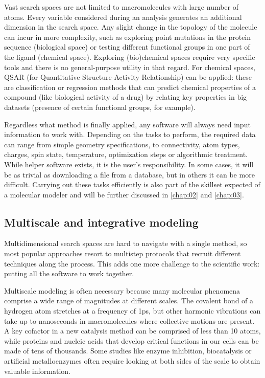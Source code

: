 Vast search spaces are not limited to macromolecules with large number of atoms. Every variable considered during an analysis generates an additional dimension in the search space. Any slight change in the topology of the molecule can incur in more complexity, such as exploring point mutations in the protein sequence (biological space) or testing different functional groups in one part of the ligand (chemical space). Exploring (bio)chemical spaces require very specific tools and there is no general-purpose utility in that regard. For chemical spaces, QSAR (for Quantitative Structure-Activity Relationship) can be applied: these are classification or regression methods that can predict chemical properties of a compound (like biological activity of a drug) by relating key properties in big datasets (presence of certain functional groups, for example).

Regardless what method is finally applied, any software will always need input information to work with. Depending on the tasks to perform, the required data can range from simple geometry specifications, to connectivity, atom types, charges, spin state, temperature, optimization steps or algorithmic treatment. While helper software exists, it is the user’s responsibility. In some cases, it will be as trivial as downloading a file from a database, but in others it can be more difficult. Carrying out these tasks efficiently is also part of the skillset expected of a molecular modeler and will be further discussed in \autoref{chap:02} and \autoref{chap:03}.

\subsection{Multiscale and integrative modeling}
Multidimensional search spaces are hard to navigate with a single method, so most popular approaches resort to multistep protocols that recruit different techniques along the process. This adds one more challenge to the scientific work: putting all the software to work together.

Multiscale modeling is often necessary because many molecular phenomena comprise a wide range of magnitudes at different scales. The covalent bond of a hydrogen atom stretches at a frequency of 1ps, but other harmonic vibrations can take up to nanoseconds in macromolecules where collective motions are present. A key cofactor in a new catalysis method can be comprised of less than 10 atoms, while proteins and nucleic acids that develop critical functions in our cells can be made of tens of thousands. Some studies like enzyme inhibition, biocatalysis or artificial metalloenzymes often require looking at both sides of the scale to obtain valuable information.

